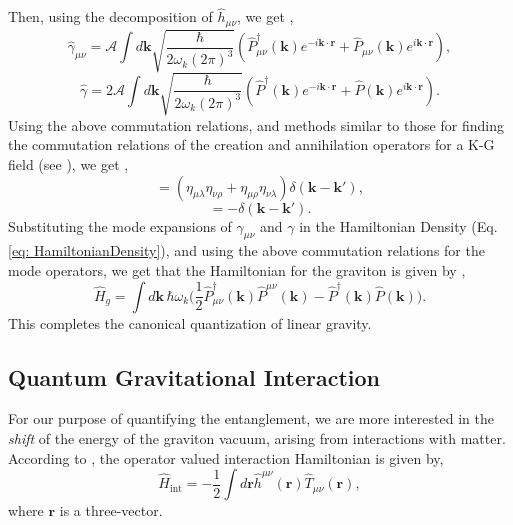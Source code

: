 \documentclass[11pt]{article}
\newcommand{\munu}{\mu\nu}
\begin{document}
Then, using the decomposition of $\hat{h}_{\munu}$, we get \cite{Bose_2022},
\begin{equation}
    \hat{\gamma}_{\munu} = \mathcal{A}\int d\bm{k} \sqrt{\frac{\hbar}{2\omega_k(2\pi)^3}}(\hat{P}_{\munu}^{\dagger}(\bm{k})e^{-i\bm{k}\cdot\bm{r}} + \hat{P}_{\munu}(\bm{k})e^{i\bm{k}\cdot\bm{r}}),
\end{equation}
\begin{equation}
    \hat{\gamma} = 2\mathcal{A}\int d\bm{k} \sqrt{\frac{\hbar}{2\omega_k(2\pi)^3}}(\hat{P}^{\dagger}(\bm{k})e^{-i\bm{k}\cdot\bm{r}} + \hat{P}(\bm{k})e^{i\bm{k}\cdot\bm{r}}).
\end{equation}
Using the above commutation relations, and methods similar to those for finding the commutation relations of the creation and annihilation operators for a K-G field (see \citet[chap. 2]{Peskin}), we get \cite{Bose_2022},
\begin{equation}
    [\hat{P}_{\munu}(\bm{k}), \hat{P}_{\lambda\rho}^{\dagger}(\bm{k'})] = (\eta_{\mu\lambda}\eta_{\nu\rho} + \eta_{\mu\rho}\eta_{\nu\lambda})\delta(\bm{k} - \bm{k'}),
\end{equation}
\begin{equation}
    [\hat{P}(\bm{k}), \hat{P}^{\dagger}\bm{k'}] = -\delta(\bm{k} - \bm{k'}).
\end{equation}
Substituting the mode expansions of $\gamma_{\munu}$ and $\gamma$ in the Hamiltonian Density (Eq. \ref{eq: HamiltonianDensity}), and using the above commutation relations for the mode operators, we get that the Hamiltonian for the graviton is given by \cite{Bose_2022, Gupta_1952},
\begin{equation}
    \hat{H}_g = \int d\bm{k}\,\hbar\omega_k\bigg(\frac{1}{2}\hat{P}_{\munu}^{\dagger}(\bm{k})\hat{P}^{\munu}(\bm{k}) - \hat{P}^{\dagger}(\bm{k})\hat{P}(\bm{k})\bigg).
    \label{eq: GravitonHamiltonian}
\end{equation}
This completes the canonical quantization of linear gravity.
\subsection{Quantum Gravitational Interaction}
For our purpose of quantifying the entanglement, we are more interested in the \textit{shift} of the energy of the graviton vacuum, arising from interactions with matter. According to \citet{weinberg}, the operator valued interaction Hamiltonian is given by,
\begin{equation}
    \hat{H}_{\text{int}} = -\frac{1}{2}\int d\bm{r} \hat{h}^{\munu}(\bm{r})\hat{T}_{\munu}(\bm{r}),
    \label{eq: InteractionHamiltonian}
\end{equation}
where $\bm{r}$ is a three-vector.
\end{document}
